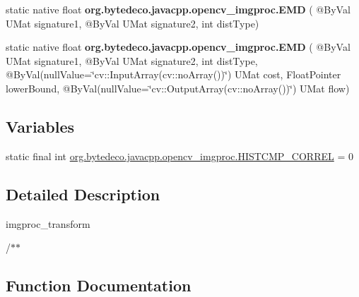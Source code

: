 \begin{DoxyCompactItemize}
static native float {\bfseries org.\+bytedeco.\+javacpp.\+opencv\+\_\+imgproc.\+E\+MD} ( @By\+Val U\+Mat signature1, @By\+Val U\+Mat signature2, int dist\+Type)
\item 
\mbox{\label{group__imgproc__hist_ga46a74595f01418c6ab4d7271744b162c}} 
static native float {\bfseries org.\+bytedeco.\+javacpp.\+opencv\+\_\+imgproc.\+E\+MD} ( @By\+Val U\+Mat signature1, @By\+Val U\+Mat signature2, int dist\+Type, @By\+Val(null\+Value=\char`\"{}cv\+::\+Input\+Array(cv\+::no\+Array())\char`\"{}) U\+Mat cost, Float\+Pointer lower\+Bound, @By\+Val(null\+Value=\char`\"{}cv\+::\+Output\+Array(cv\+::no\+Array())\char`\"{}) U\+Mat flow)
\end{DoxyCompactItemize}
\subsection*{Variables}
\begin{DoxyCompactItemize}
\item 
static final int \hyperlink{group__imgproc__hist_ga191607eeab47aa090f1b49b4e1198f6a}{org.\+bytedeco.\+javacpp.\+opencv\+\_\+imgproc.\+H\+I\+S\+T\+C\+M\+P\+\_\+\+C\+O\+R\+R\+EL} = 0
\end{DoxyCompactItemize}


\subsection{Detailed Description}
imgproc\+\_\+transform 

/$\ast$$\ast$ 

\subsection{Function Documentation}
\mbox{\label{group__imgproc__hist_gaf0312cafdf92e7baeb662d460281307e}} 

